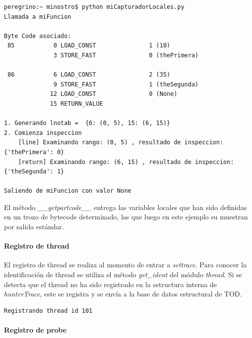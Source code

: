 \documentclass[12pt,legalpaper]{report}
\begin{document}
\begin{singlespace}
\begin{lstlisting}[style=consola,numbers=none]
peregrino:~ minostro$ python miCapturadorLocales.py
Llamada a miFuncion

Byte Code asociado:
 85           0 LOAD_CONST               1 (10)
              3 STORE_FAST               0 (thePrimera)

 86           6 LOAD_CONST               2 (35)
              9 STORE_FAST               1 (theSegunda)
             12 LOAD_CONST               0 (None)
             15 RETURN_VALUE        

1. Generando lnotab =  {6: (0, 5), 15: (6, 15)}
2. Comienza inspeccion
    [line] Examinando rango: (0, 5) , resultado de inspeccion: {'thePrimera': 0}
    [return] Examinando rango: (6, 15) , resultado de inspeccion: {'theSegunda': 1}
    
Saliendo de miFuncion con valor None
\end{lstlisting}
\end{singlespace}



El método \textit{\_\_getpartcode\_\_} entrega las variables locales que han sido definidas en un trozo de bytecode determinado, las que luego en este ejemplo su muestran por salida estándar.

				\paragraph{Registro de thread}
				
El registro de thread se realiza al momento de entrar a \textit{settrace}. Para conocer la identificación de thread se utiliza el método \textit{get\_ident} del módulo \textit{thread}.  Si se detecta que el thread no ha sido registrado en la estructura interna de \textit{hunterTrace}, este se registra y se envía a la base de datos estructural de TOD.

\begin{singlespace}
\begin{lstlisting}[style=consola,numbers=none]
Registrando thread id 101
\end{lstlisting}
\end{singlespace}
				
				\paragraph{Registro de probe}
				
\end{document}
